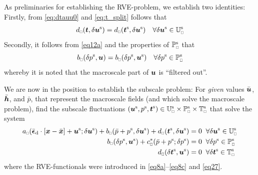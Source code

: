 \documentclass{bmcart}
\newcommand{\eqtrefrange}[2]{\eqref{#1}--\eqref{#2}}
\newcommand{\eqtref}[1]{\eqref{#1}}
\renewcommand{\dev}{\mathrm{d}}
\newcommand{\rve}{
  {\mathchoice
   {\mbox{\scalebox{0.67}{$\Box$}}}
   {\mbox{\scalebox{0.67}{$\Box$}}}
   {\mbox{\scalebox{0.5}{$\Box$}}}
   {\mbox{\scalebox{0.375}{$\Box$}}}
  }
}
\begin{document}
As preliminaries for establishing the RVE-problem, we establish two identities:
Firstly, from \eqtref{eq:dtauu0} and \eqtref{eq:t_split} follows that
\begin{align}
d_\rve(\ta t,\delta\ta u^\fluct) = d_\rve(\ta t^\fluct, \delta\ta u^\fluct)\quad \forall\delta\ta u^\fluct \in\set{U}_\rve^\fluct
\end{align}
Secondly, it follows from \eqtref{eq12a} and the properties of $\set{P}_\rve^\fluct$ that
\begin{equation}
    b_\rve(\delta p^\fluct,\ta{u}) = b_\rve(\delta p^\fluct,\ta{u}^\fluct) \quad\forall \delta p^\fluct\in\set{P}_\rve^\fluct
\label{eq27c}
\end{equation}
whereby it is noted that the macroscale part of $\boldsymbol{u}$ is ``filtered out''.




We are now in the position to establish the subscale problem:
For \emph{given} values $\bar{\boldsymbol{u}}$, $\bar{\boldsymbol{h}}$, and $\bar{p}$, that represent the macroscale fields (and which solve the macroscale problem), find the subscale fluctuations $(\ta{u}^\fluct,p^\fluct,\ta{t}^\fluct)\in\set{U}_\rve^\fluct\times\set{P}_\rve^\fluct\times\set{T}_\rve^\fluct$ that solve the system
\begin{subequations}\label{eq31}
\begin{align}
    a_\rve(\bar{\ts\epsilon}_\dev\cdot [\ta{x}-\bar{\ta{x}}]+\ta{u}^\fluct;\delta\ta{u}^\fluct) +
    b_\rve(\bar{p}+p^\fluct,\delta\ta{u}^\fluct) +
    d_\rve(\ta{t}^\fluct,\delta\ta{u}^\fluct) &= 0
    \;\;\forall \delta\ta{u}^\fluct \in \set{U}_\rve^\fluct
\label{eq31a} \\
    b_\rve(\delta p^\fluct,\ta{u}^\fluct) + c^*_\rve(\bar{p}+p^\fluct;\delta p^\fluct) &= 0
    \;\;\forall \delta p^\fluct \in \set{P}_\rve^\fluct
\label{eq31b} \\
    d_\rve(\delta\ta{t}^\fluct,\ta{u}^\fluct) &= 0
    \;\;\forall \delta \ta{t}^\fluct \in \set{T}_\rve^\fluct
\label{eq31c}
\end{align}
\end{subequations}
where the RVE-functionals were introduced in \eqtrefrange{eq8a}{eq8c} and \eqtref{eq27}.
\end{document}

